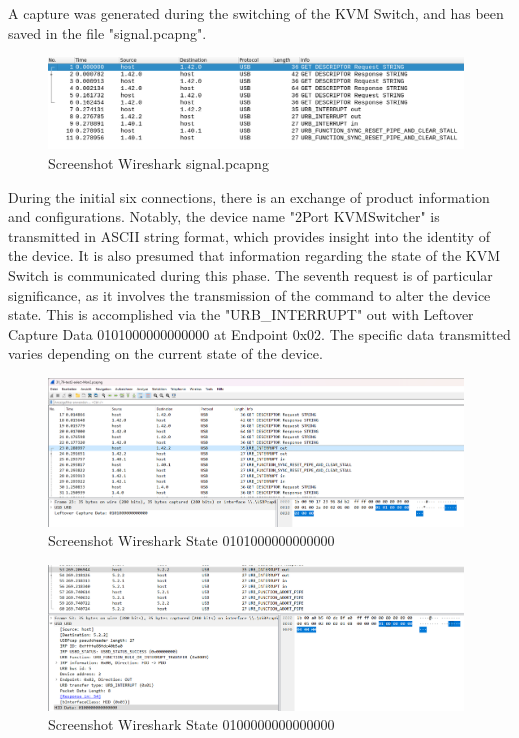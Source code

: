 A capture was generated during the switching of the KVM Switch, and has been saved in the file "signal.pcapng".

\begin{figure}[htp!]
    \centering
    \includegraphics[width=11cm]{img/signal.png}
    \caption{Screenshot Wireshark signal.pcapng}
    \label{fig:Screenshot Wireshark signal.pcapng}
\end{figure}

During the initial six connections, there is an exchange of product information and configurations. Notably, the device name "2Port KVMSwitcher" is transmitted in ASCII string format, which provides insight into the identity of the device. It is also presumed that information regarding the state of the KVM Switch is communicated during this phase. The seventh request is of particular significance, as it involves the transmission of the command to alter the device state. This is accomplished via the "URB\_INTERRUPT" out with Leftover Capture Data 0101000000000000 at Endpoint 0x02. The specific data transmitted varies depending on the current state of the device.

\begin{figure}[htp!]
    \centering
    \includegraphics[width=11cm]{img/packet_1_2.png}
    \caption{Screenshot Wireshark State 0101000000000000}
    \label{fig:Screenshot Wireshark State 0101000000000000}
\end{figure}

\begin{figure}[htp!]
    \centering
    \includegraphics[width=11cm]{img/packet_2_1.png}
    \caption{Screenshot Wireshark State 0100000000000000}
    \label{fig:Screenshot Wireshark State 0100000000000000}
\end{figure}

